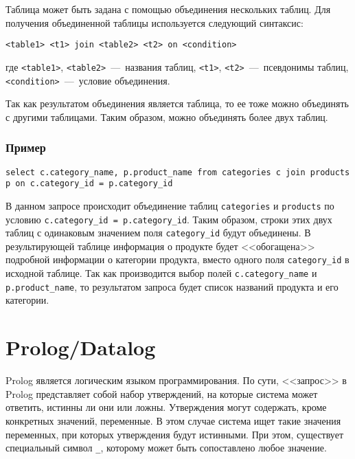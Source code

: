 \begin{appendices}
Таблица может быть задана с помощью объединения нескольких таблиц. Для получения объединенной таблицы используется следующий синтаксис:

\begin{lstlisting}[label=sql-syntax-join,caption=Синтаксис объединения таблиц в SQL]
<table1> <t1> join <table2> <t2> on <condition>
\end{lstlisting}

\noindent где \texttt{<table1>}, \texttt{<table2>}~---~названия таблиц,  \texttt{<t1>}, \texttt{<t2>}~---~псевдонимы таблиц, \texttt{<condition>}~---~условие объединения. 

Так как результатом объединения является таблица, то ее тоже можно объединять с другими таблицами. Таким образом, можно объединять более двух таблиц.

\newpage

\subsubsection*{Пример}

\begin{lstlisting}[label=sql-syntax-ex-2,caption=Пример запроса с объединением на SQL]
select c.category_name, p.product_name from categories c join products p on c.category_id = p.category_id
\end{lstlisting}

В данном запросе происходит объединение таблиц \texttt{categories} и \texttt{products} по условию \texttt{c.category\_id = p.category\_id}. Таким образом, строки этих двух таблиц с одинаковым значением поля \texttt{category\_id} будут объединены. В результирующей таблице информация о продукте будет <<обогащена>> подробной информации о категории продукта, вместо одного поля \texttt{category\_id} в исходной таблице. Так как производится выбор полей \texttt{c.category\_name} и \texttt{p.product\_name}, то результатом запроса будет список названий продукта и его категории.

\section{Prolog/Datalog}

Prolog является логическим языком программирования. По сути, <<запрос>> в Prolog представляет собой набор утверждений, на которые система может ответить, истинны ли они или ложны. Утверждения могут содержать, кроме конкретных значений, переменные. В этом случае система ищет такие значения переменных, при которых утверждения будут истинными. При этом, существует специальный символ \texttt{\_}, которому может быть сопоставлено любое значение.


\end{appendices}
